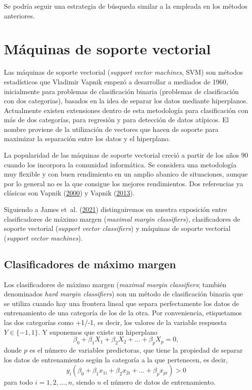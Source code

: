 \documentclass[
  spanish,
]{book}
\theoremstyle{break}
\theoremstyle{definition}
\theoremstyle{definition}
\theoremstyle{definition}
\theoremstyle{remark}
\begin{document}
Se podría seguir una estrategia de búsqueda similar a la empleada en los métodos anteriores.

\hypertarget{svm}{%
\chapter{Máquinas de soporte vectorial}\label{svm}}

Las máquinas de soporte vectorial (\emph{support vector machines}, SVM) son métodos estadísticos que Vladimir Vapnik empezó a desarrollar a mediados de 1960, inicialmente para problemas de clasificación binaria (problemas de clasificación con dos categorias), basados en la idea de separar los datos mediante hiperplanos. Actualmente existen extensiones dentro de esta metodología para clasificación con más de dos categorías, para regresión y para detección de datos atípicos. El nombre proviene de la utilización de vectores que hacen de soporte para maximizar la separación entre los datos y el hiperplano.

La popularidad de las máquinas de soporte vectorial creció a partir de los años 90 cuando los incorpora la comunidad informática. Se considera una metodología muy flexible y con buen rendimiento en un amplio abanico de situaciones, aunque por lo general no es la que consigue los mejores rendimientos. Dos referencias ya clásicas son Vapnik (\protect\hyperlink{ref-vapnik1998}{2000}) y Vapnik (\protect\hyperlink{ref-vapnik2013nature}{2013}).

Siguiendo a James et~al. (\protect\hyperlink{ref-james2021introduction}{2021}) distinguiremos en nuestra exposición entre clasificadores de máximo margen (\emph{maximal margin classifiers}), clasificadores de soporte vectorial (\emph{support vector classifiers}) y máquinas de soporte vectorial (\emph{support vector machines}).

\hypertarget{clasificadores-de-muxe1ximo-margen}{%
\section{Clasificadores de máximo margen}\label{clasificadores-de-muxe1ximo-margen}}

Los clasificadores de máximo margen (\emph{maximal margin classifiers}; también denominados \emph{hard margin classifiers}) son un método de clasificación binaria que se utiliza cuando hay una frontera lineal que separa perfectamente los datos de entrenamiento de una categoría de los de la otra. Por conveniencia, etiquetamos las dos categorías como +1/-1, es decir, los valores de la variable respuesta \(Y \in \{-1, 1\}\). Y suponemos que existe un hiperplano
\[ \beta_0 + \beta_1 X_1 + \beta_2 X_2 + \ldots + \beta_p X_p = 0,\]
donde \(p\) es el número de variables predictoras, que tiene la propiedad de separar los datos de entrenamiento según la categoría a la que pertenecen, es decir,
\[ y_i(\beta_0 + \beta_1 x_{1i} + \beta_2 x_{2i} + \ldots + \beta_p x_{pi}) > 0\]
para todo \(i = 1, 2, \ldots, n\), siendo \(n\) el número de datos de entrenamiento.
\end{document}
